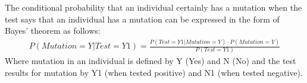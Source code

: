 The conditional probability that an individual certainly has a mutation when the test says that an individual has a mutation can be expressed in the form of Bayes' theorem as follows:
\begin{align*}
    P(Mutation = Y|Test =Y1) = \frac{P(Test = Y1|Mutation =Y)\cdot P(Mutation =Y)}{P(Test = Y1)}
\end{align*}
Where mutation in an individual is defined by Y (Yes) and N (No) and the test results for mutation by Y1 (when tested positive) and N1 (when tested negative). 
